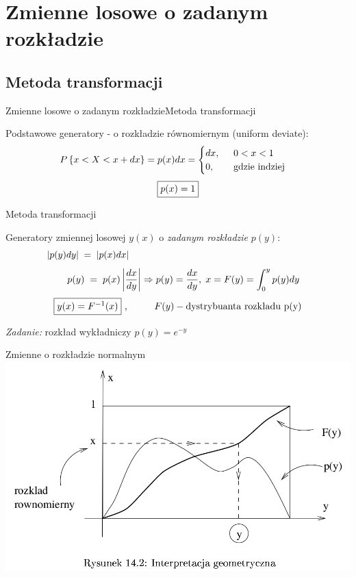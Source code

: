 \section{Zmienne losowe o zadanym rozkładzie}
\subsection{Metoda transformacji}
\begin{frame}{Zmienne losowe o zadanym rozkładzie\linebreak Metoda transformacji}
	\begin{block}{Podstawowe generatory - o rozkładzie równomiernym (uniform deviate):}
		\[
			P\left\{x < X < x + dx\right\} = p(x)dx = \begin{cases}
				dx,\hspace{0.5cm} 0 < x < 1\\
				0,\hspace{0.65cm} $ gdzie indziej$
			\end{cases}
		\]
		\[
			\fbox{$p(x) = 1$}
		\]
	\end{block}
\end{frame}
\begin{frame}{Metoda transformacji}
	\begin{block}{Generatory zmiennej losowej $y(x)$ o \textit{zadanym rozkładzie}
	$p(y)$:}
	\[
		\lvert p(y)dy \rvert \hspace{0.1cm} = \hspace{0.1cm} \lvert p(x)dx \rvert \hspace{6.8cm}
	\]
	\[
		\phantom{x} \hspace{0.2cm} p(y) \hspace{0.1cm} = \hspace{0.1cm} p(x) \left| \frac{dx}{dy} \right| \Rightarrow p(y) = \frac{dx}{dy}, \hspace{0.1cm} x = F(y) = \int_{0}^{y} p(y)dy
	\]
	\[
		\fbox{$y(x) = F^{-1}(x)$} \text{ ,} \hspace{1cm} F(y) - \text{dystrybuanta rozkładu p(y)}
	\]
	\end{block}
	\vspace{1cm}
	
	\flushright \textit{Zadanie: } rozkład wykładniczy $p(y) = e^{-y}$
\end{frame}
\begin{frame}{Zmienne o rozkładzie normalnym}
	\centering \includegraphics[width=1\linewidth]{img/14/14_6_1_img.png}
\end{frame}
